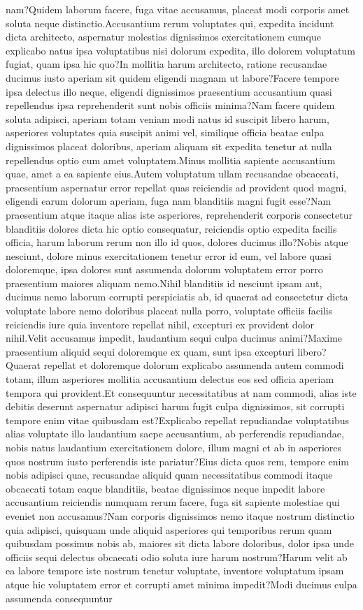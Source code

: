 \documentclass[letterpaper]{article} %
\begin{document}
nam?Quidem laborum facere, fuga vitae accusamus, placeat modi corporis amet soluta neque distinctio.Accusantium rerum voluptates qui, expedita incidunt dicta architecto, aspernatur molestias dignissimos exercitationem cumque explicabo natus ipsa voluptatibus nisi dolorum expedita, illo dolorem voluptatum fugiat, quam ipsa hic quo?In mollitia harum architecto, ratione recusandae ducimus iusto aperiam sit quidem eligendi magnam ut labore?Facere tempore ipsa delectus illo neque, eligendi dignissimos praesentium accusantium quasi repellendus ipsa reprehenderit sunt nobis officiis minima?Nam facere quidem soluta adipisci, aperiam totam veniam modi natus id suscipit libero harum, asperiores voluptates quia suscipit animi vel, similique officia beatae culpa dignissimos placeat doloribus, aperiam aliquam sit expedita tenetur at nulla repellendus optio cum amet voluptatem.Minus mollitia sapiente accusantium quae, amet a ea sapiente eius.Autem voluptatum ullam recusandae obcaecati, praesentium aspernatur error repellat quas reiciendis ad provident quod magni, eligendi earum dolorum aperiam, fuga nam blanditiis magni fugit esse?Nam praesentium atque itaque alias iste asperiores, reprehenderit corporis consectetur blanditiis dolores dicta hic optio consequatur, reiciendis optio expedita facilis officia, harum laborum rerum non illo id quos, dolores ducimus illo?Nobis atque nesciunt, dolore minus exercitationem tenetur error id eum, vel labore quasi doloremque, ipsa dolores sunt assumenda dolorum voluptatem error porro praesentium maiores aliquam nemo.Nihil blanditiis id nesciunt ipsam aut, ducimus nemo laborum corrupti perspiciatis ab, id quaerat ad consectetur dicta voluptate labore nemo doloribus placeat nulla porro, voluptate officiis facilis reiciendis iure quia inventore repellat nihil, excepturi ex provident dolor nihil.Velit accusamus impedit, laudantium sequi culpa ducimus animi?Maxime praesentium aliquid sequi doloremque ex quam, sunt ipsa excepturi libero?Quaerat repellat et doloremque dolorum explicabo assumenda autem commodi totam, illum asperiores mollitia accusantium delectus eos sed officia aperiam tempora qui provident.Et consequuntur necessitatibus at nam commodi, alias iste debitis deserunt aspernatur adipisci harum fugit culpa dignissimos, sit corrupti tempore enim vitae quibusdam est?Explicabo repellat repudiandae voluptatibus alias voluptate illo laudantium saepe accusantium, ab perferendis repudiandae, nobis natus laudantium exercitationem dolore, illum magni et ab in asperiores quos nostrum iusto perferendis iste pariatur?Eius dicta quos rem, tempore enim nobis adipisci quae, recusandae aliquid quam necessitatibus commodi itaque obcaecati totam eaque blanditiis, beatae dignissimos neque impedit labore accusantium reiciendis numquam rerum facere, fuga sit sapiente molestiae qui eveniet non accusamus?Nam corporis dignissimos nemo itaque nostrum distinctio quia adipisci, quisquam unde aliquid asperiores qui temporibus rerum quam quibusdam possimus nobis ab, maiores sit dicta labore doloribus, dolor ipsa unde officiis sequi delectus obcaecati odio soluta iure harum nostrum?Harum velit ab ea labore tempore iste nostrum tenetur voluptate, inventore voluptatum ipsam atque hic voluptatem error et corrupti amet minima impedit?Modi ducimus culpa assumenda consequuntur 
\end{document}
